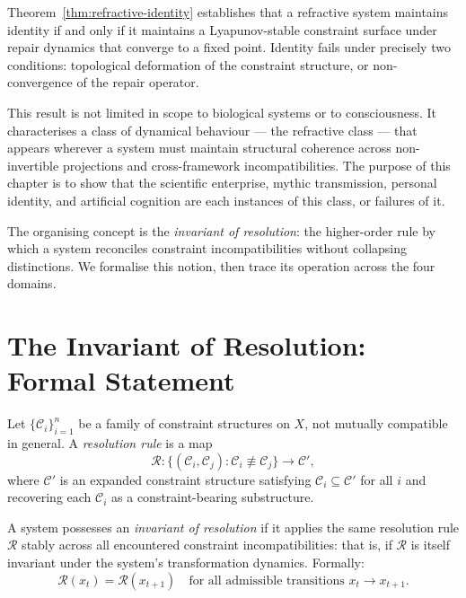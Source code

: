 \documentclass[11pt,openany]{book}
\begin{document}
Theorem~\ref{thm:refractive-identity} establishes that a
refractive system maintains identity if and only if it
maintains a Lyapunov-stable constraint surface under repair
dynamics that converge to a fixed point.  Identity fails
under precisely two conditions: topological deformation of
the constraint structure, or non-convergence of the repair
operator.

This result is not limited in scope to biological systems
or to consciousness.  It characterises a class of dynamical
behaviour --- the refractive class --- that appears wherever
a system must maintain structural coherence across
non-invertible projections and cross-framework
incompatibilities.  The purpose of this chapter is to show
that the scientific enterprise, mythic transmission,
personal identity, and artificial cognition are each
instances of this class, or failures of it.

The organising concept is the \emph{invariant of
resolution}: the higher-order rule by which a system
reconciles constraint incompatibilities without collapsing
distinctions.  We formalise this notion, then trace its
operation across the four domains.

\section{The Invariant of Resolution: Formal Statement}
\label{sec:invariant-formal}

\begin{definition}
\label{def:resolution-rule}
Let $\{\mathcal{C}_i\}_{i=1}^n$ be a family of constraint
structures on $X$, not mutually compatible in general.
A \emph{resolution rule} is a map
\[
  \mathcal{R} : \bigl\{(\mathcal{C}_i, \mathcal{C}_j) :
    \mathcal{C}_i \not\equiv \mathcal{C}_j\bigr\}
    \longrightarrow \mathcal{C}',
\]
where $\mathcal{C}'$ is an expanded constraint structure
satisfying $\mathcal{C}_i \subseteq \mathcal{C}'$ for all
$i$ and recovering each $\mathcal{C}_i$ as a
constraint-bearing substructure.
\end{definition}

\begin{definition}
\label{def:invariant-resolution}
A system possesses an \emph{invariant of resolution} if it
applies the same resolution rule $\mathcal{R}$ stably
across all encountered constraint incompatibilities: that
is, if $\mathcal{R}$ is itself invariant under the system's
transformation dynamics.  Formally:
\[
  \mathcal{R}(x_t) = \mathcal{R}(x_{t+1})
  \quad \text{for all admissible transitions } x_t \to x_{t+1}.
\]
\end{definition}
\end{document}
